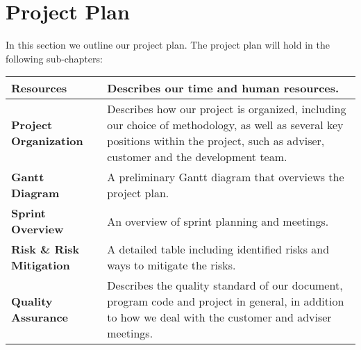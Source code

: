 \documentclass[../document.tex]{subfiles}
\begin{document}
\section*{Project Plan}

In this section we outline our project plan. The project plan will hold in the following sub-chapters:

\begin{table}[h]
	\renewcommand\arraystretch{1.4}
	\begin{tabularx}{\textwidth}{lX}\hline
		\textbf{Resources}	& Describes our time and human resources.	\\\hline
		\textbf{Project Organization}	& Describes how our project is organized, including our choice of methodology, as well as several key positions within the project, such as adviser, customer and the development team.	\\\hline
		\textbf{Gantt Diagram}	& A preliminary Gantt diagram that overviews the project plan.	\\\hline
		\textbf{Sprint Overview}	&  An overview of sprint planning and meetings.	\\\hline
		\textbf{Risk \& Risk Mitigation}	& A detailed table including identified risks and ways to mitigate the risks.	\\\hline
		\textbf{Quality Assurance}	& Describes the quality standard of our document, program code and project in general, in addition to how we deal with the customer and adviser meetings.	\\\hline
	\end{tabularx}
\end{table}
\end{document}
